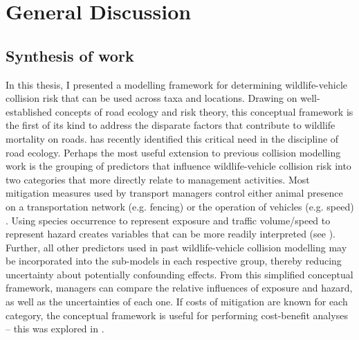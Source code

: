 \chapter{General Discussion}\label{sec:conc}
\newpage

\section{Synthesis of work}

In this thesis, I presented a modelling framework for determining wildlife-vehicle collision risk that can be used across taxa and locations. Drawing on well-established concepts of road ecology and risk theory, this conceptual framework is the first of its kind to address the disparate factors that contribute to wildlife mortality on roads. \cite{clev15} has recently identified this critical need in the discipline of road ecology. Perhaps the most useful extension to previous collision modelling work is the grouping of predictors that influence wildlife-vehicle collision risk into two categories that more directly relate to management activities. Most mitigation measures used by transport managers control either animal presence on a transportation network (e.g. fencing) or the operation of vehicles (e.g. speed) \citep{glis09}.  Using species occurrence to represent exposure and traffic volume/speed to represent hazard creates variables that can be more readily interpreted (see ). Further, all other predictors used in past wildlife-vehicle collision modelling may be incorporated into the sub-models in each respective group, thereby reducing uncertainty about potentially confounding effects. From this simplified conceptual framework, managers can compare the relative influences of exposure and hazard, as well as the uncertainties of each one. If costs of mitigation are known for each category, the conceptual framework is useful for performing cost-benefit analyses -- this was explored in .

